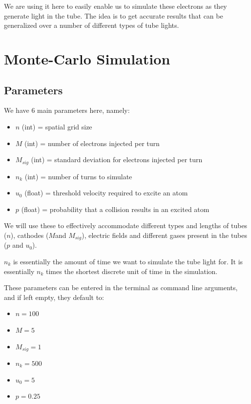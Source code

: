 \documentclass[12pt]{article}
\begin{document}
We are using it here to easily enable us to simulate these electrons as they generate light in the tube. The idea is to get accurate results that can be generalized over a number of different types of tube lights.

\pagebreak
\section{Monte-Carlo Simulation}

\subsection{Parameters}
We have 6 main parameters here, namely:

\begin{itemize}
    \item $n$    (int)   = spatial grid size
    \item $M$    (int)   = number of electrons injected per turn
    \item $M_{sig}$ (int)   = standard deviation for electrons injected per turn
    \item $n_k$   (int)   = number of turns to simulate
    \item $u_0$   (float) = threshold velocity required to excite an atom
    \item $p$    (float) = probability that a collision results in an excited atom
\end{itemize}

We will use these to effectively accommodate different types and lengths of tubes ($n$), cathodes ($M$and $M_{sig}$), electric fields and different gases present in the tubes ($p$ and $u_0$).

$n_k$ is essentially the amount of time we want to simulate the tube light for. It is essentially $n_k$ times the shortest discrete unit of time in the simulation.

These parameters can be entered in the terminal as command line arguments, and if left empty, they default to:

\begin{itemize}
    \item $n = 100$
    \item $M = 5$
    \item $M_{sig} = 1$
    \item $n_k = 500$
    \item $u_0 = 5$
    \item $p = 0.25$
\end{itemize}
\end{document}
